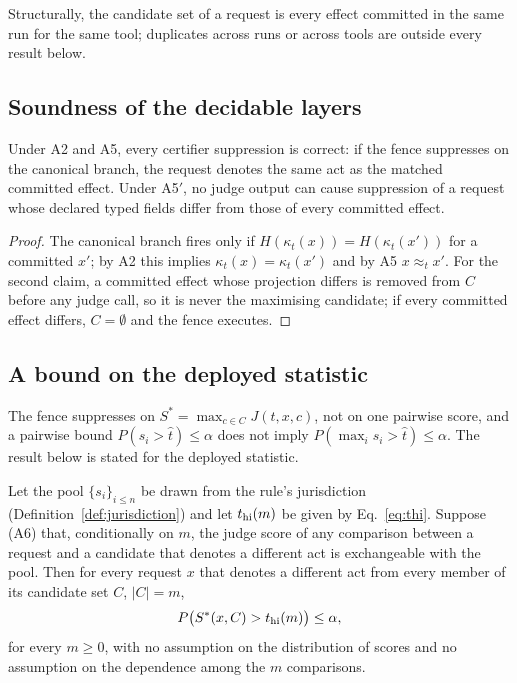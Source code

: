 Structurally, the candidate set of a request is every effect committed in the same run for the same tool; duplicates across runs or across tools are outside every result below.

\subsection{Soundness of the decidable layers}

\begin{proposition}\label{prop:sound}
Under A2 and A5, every certifier suppression is correct: if the fence suppresses on the canonical branch, the request denotes the same act as the matched committed effect. Under A5$'$, no judge output can cause suppression of a request whose declared typed fields differ from those of every committed effect.
\end{proposition}

\begin{proof}
The canonical branch fires only if $H(\kappa_t(x))=H(\kappa_t(x'))$ for a committed $x'$; by A2 this implies $\kappa_t(x)=\kappa_t(x')$ and by A5 $x\approx_t x'$. For the second claim, a committed effect whose projection differs is removed from $C$ before any judge call, so it is never the maximising candidate; if every committed effect differs, $C=\emptyset$ and the fence executes.
\end{proof}

\subsection{A bound on the deployed statistic}\label{sec:bound}

The fence suppresses on $S^\ast=\max_{c\in C}J(t,x,c)$, not on one pairwise score, and a pairwise bound $P(s_i>\hat t)\le\alpha$ does not imply $P(\max_i s_i>\hat t)\le\alpha$. The result below is stated for the deployed statistic.

\begin{theorem}\label{thm:bound}
Let the pool $\{s_i\}_{i\le n}$ be drawn from the rule's jurisdiction (Definition~\ref{def:jurisdiction}) and let $t_{\mathrm{hi}}(m)$ be given by Eq.~\eqref{eq:thi}. Suppose (A6) that, conditionally on $m$, the judge score of any comparison between a request and a candidate that denotes a different act is exchangeable with the pool. Then for every request $x$ that denotes a different act from every member of its candidate set $C$, $|C|=m$,
\[
P\big(S^\ast(x,C)>t_{\mathrm{hi}}(m)\big)\le\alpha ,
\]
for every $m\ge0$, with no assumption on the distribution of scores and no assumption on the dependence among the $m$ comparisons.
\end{theorem}

